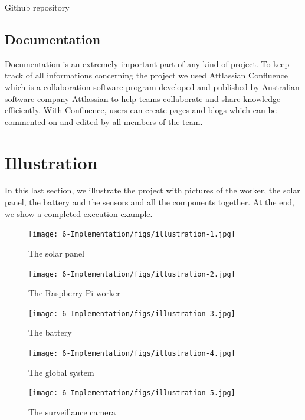 \begin{itemize}
        Github repository\cite{color-transfer}

    \end{itemize}


    \subsection{Documentation}
        Documentation is an extremely important part of any kind of project. To keep track of all informations
        concerning the project we used Attlassian Confluence which is a collaboration software
        program developed and published by Australian software company Attlassian to help teams collaborate
        and share knowledge efficiently. With Confluence, users can create pages and blogs which can be
        commented on and edited by all members of the team.

\section{Illustration}
    In this last section, we illustrate the project with pictures of the worker, the solar panel, the battery
    and the sensors and all the components together. At the end, we show a completed execution example.

    \begin{figure}[!h]\centering
        \texttt{[image: 6-Implementation/figs/illustration-1.jpg]}
        \caption{The solar panel}
    \end{figure}

    \begin{figure}[!h]\centering
        \texttt{[image: 6-Implementation/figs/illustration-2.jpg]}
        \caption{The Raspberry Pi worker}
    \end{figure}

    \begin{figure}[!h]\centering
        \texttt{[image: 6-Implementation/figs/illustration-3.jpg]}
        \caption{The battery}
    \end{figure}

    \begin{figure}[!h]\centering
        \texttt{[image: 6-Implementation/figs/illustration-4.jpg]}
        \caption{The global system}
    \end{figure}

    \begin{figure}[!h]\centering
        \texttt{[image: 6-Implementation/figs/illustration-5.jpg]}
        \caption{The surveillance camera}
    \end{figure}

